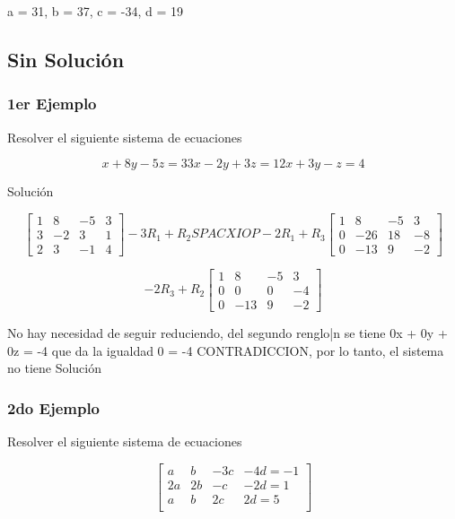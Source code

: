 \documentclass{article}
\begin{document}
a = 31, b = 37, c = -34, d = 19

\subsection{Sin Solución}


\subsubsection{1er Ejemplo}

Resolver el siguiente sistema de ecuaciones

\[
    x+8y -5z = 3
    3x-2y+3z = 1
    2x +3y -z = 4
\]

Solución

\[
    \begin{bmatrix} 1 & 8 & -5 & 3   \\ 3 & -2 & 3 & 1  \\ 2 & 3 & -1 & 4  \end{bmatrix}
    -3R_1 + R_2 SPACXIOP -2R_1 + R_3
    \begin{bmatrix} 1 & 8 & -5 & 3   \\ 0 & -26 & 18 & -8  \\ 0 & -13 & 9 & -2  \end{bmatrix}
\]

\[
    -2R_3 + R_2
    \begin{bmatrix} 1 & 8 & -5 & 3   \\ 0 & 0 & 0 & -4  \\ 0 & -13 & 9 & -2  \end{bmatrix}
\]

No hay necesidad de seguir reduciendo, del segundo renglo|n se tiene 0x + 0y + 0z = -4
que da la igualdad 0 = -4 CONTRADICCION, por lo tanto, el sistema no tiene Solución

\subsubsection{2do Ejemplo}

Resolver el siguiente sistema de ecuaciones

\[
    \begin{bmatrix}

         a & b & -3c & -4d = -1  \\
         2a & 2b & -c & -2d = 1  \\
         a & b & 2c &   2d  =5 \\

    \end{bmatrix}
\]
\end{document}
